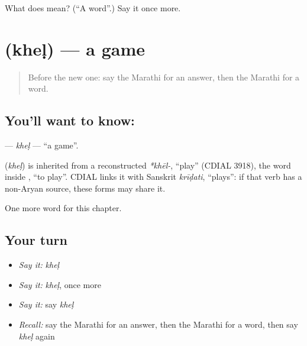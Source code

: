 \begin{tcolorbox}[breakable,colback=teal!4,colframe=teal!35!black,title={Before you move on}]
What does  mean? (\textquotedblleft{}A word\textquotedblright{}.) Say it once more.
\end{tcolorbox}
\section[\texorpdfstring{\mr{खेळ} (kheḷ)}{खेळ (kheḷ)}]{ (kheḷ) — a game}

\label{lesson:MR-C95-khel}



\begin{quote}
Before the new one: say the Marathi for an answer, then the Marathi for a word.
\end{quote}

\subsection*{You'll want to know: }
\textbf{} — \emph{kheḷ} — \textquotedblleft{}a game\textquotedblright{}.

\begin{cousinweb}
\textbf{} (\emph{kheḷ}) is inherited from a reconstructed \emph{*khēl-}, \textquotedblleft{}play\textquotedblright{} (CDIAL 3918), the word inside \textbf{}, \textquotedblleft{}to play\textquotedblright{}. CDIAL links it with Sanskrit \emph{krīḍati}, \textquotedblleft{}plays\textquotedblright{}: if that verb has a non-Aryan source, these forms may share it.
\end{cousinweb}

\begin{grammarlens}[title={What you've built}]
One more word for this chapter.
\end{grammarlens}

\subsection*{Your turn}
\begin{itemize}
\raggedright
  \item \emph{Say it:} \emph{kheḷ}
  \item \emph{Say it:} \emph{kheḷ}, once more
  \item \emph{Say it:} say \emph{kheḷ}
  \item \emph{Recall:} say the Marathi for an answer, then the Marathi for a word, then say \emph{kheḷ} again
\end{itemize}

